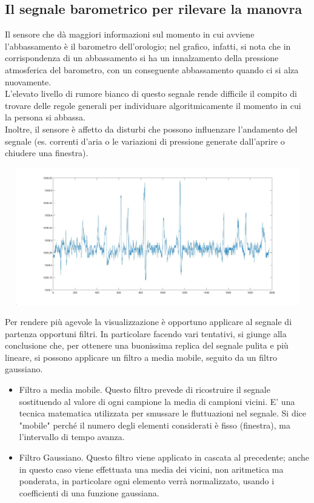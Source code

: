 \documentclass[a4paper]{article}
\begin{document}
\subsection{Il segnale barometrico per rilevare la manovra}


Il sensore che dà maggiori informazioni sul momento in cui avviene l’abbassamento è il barometro dell'orologio; nel grafico, infatti, si nota che in corrispondenza di un abbassamento si ha un innalzamento della pressione atmosferica del barometro, con un conseguente abbassamento quando ci si alza nuovamente.\\
L’elevato livello di rumore bianco di questo segnale rende difficile il compito di trovare delle regole generali per individuare algoritmicamente il momento in cui la persona si abbassa. \\
Inoltre, il sensore è affetto da disturbi che possono influenzare l’andamento del segnale (es. correnti d’aria o le variazioni di pressione generate dall’aprire o chiudere una finestra).
\makebox[\linewidth]{}
\makebox[\linewidth]{}
\begin{minipage}{\linewidth}
\begin{center}
\includegraphics[width=150mm, height= 60mm]{./images/registrazione_tesi/pressure_watch.jpg} 
\end{center}
\end{minipage}
\makebox[\linewidth]{}
\makebox[\linewidth]{} 
Per rendere più agevole la visualizzazione è opportuno applicare al segnale di partenza opportuni filtri. In particolare facendo vari tentativi, si giunge alla conclusione che, per ottenere una buonissima replica del segnale pulita e più lineare, si possono applicare un filtro a media mobile, seguito da un filtro gaussiano.
\begin {itemize}
\item Filtro a media mobile. Questo filtro prevede di ricostruire il segnale sostituendo al valore di ogni campione la media di campioni vicini. E’ una tecnica matematica utilizzata per smussare le fluttuazioni nel segnale. Si dice "mobile" perché il numero degli elementi considerati è fisso (finestra), ma l'intervallo di tempo avanza.
\item Filtro Gaussiano. Questo filtro viene applicato in cascata al precedente; anche in questo caso viene effettuata una media dei vicini, non aritmetica ma ponderata, in particolare ogni elemento verrà normalizzato, usando i coefficienti di una funzione gaussiana.
\end{itemize}
\end{document}
